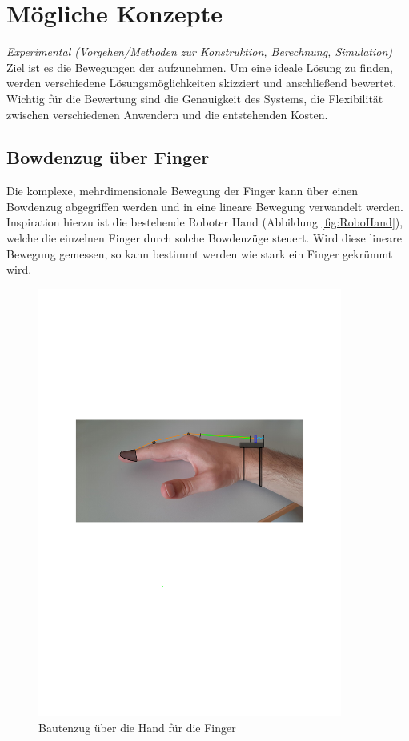 \documentclass[a4paper,12pt,final]{article} %
\numberwithin{equation}{section} %
\numberwithin{figure}{section} %
\numberwithin{table}{section} %
\begin{document}
\newpage
\section{Mögliche Konzepte}
\emph{Experimental (Vorgehen/Methoden zur Konstruktion, Berechnung, Simulation)}
Ziel ist es die Bewegungen der aufzunehmen.
Um eine ideale Lösung zu finden, werden verschiedene Lösungsmöglichkeiten skizziert und anschließend bewertet.
Wichtig für die Bewertung sind die Genauigkeit des Systems, die Flexibilität zwischen verschiedenen Anwendern und die entstehenden Kosten. 
\subsection{Bowdenzug über Finger}
Die komplexe, mehrdimensionale Bewegung der Finger kann über einen Bowdenzug abgegriffen werden und in eine lineare Bewegung verwandelt werden.
Inspiration hierzu ist die bestehende Roboter Hand (Abbildung \ref{fig:RoboHand}), welche die einzelnen Finger durch solche Bowdenzüge steuert.
Wird diese lineare Bewegung gemessen, so kann bestimmt werden wie stark ein Finger gekrümmt wird. 
\begin{figure}[H]
	\begin{center}
		\includegraphics[width=10cm]{Bilder/HandPhoto1.pdf}
		\caption{Bautenzug über die Hand für die Finger}
		\label{fig:HandFinger}
	\end{center}
\end{figure}
\end{document}

